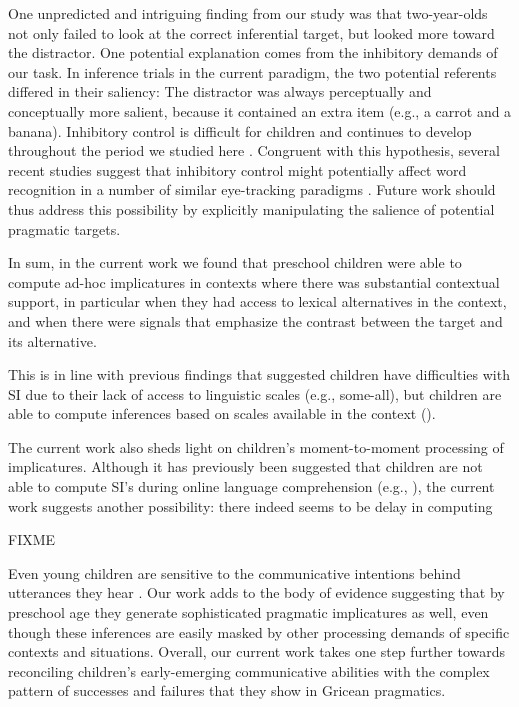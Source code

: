 \documentclass[10pt,letterpaper]{article}
\begin{document}
One unpredicted and intriguing finding from our study was that two-year-olds not only failed to look at the correct inferential target, but looked more toward the distractor. One potential explanation comes from the inhibitory demands of our task. In inference trials in the current paradigm, the two potential referents differed in their saliency: The distractor was always perceptually and conceptually more salient, because it contained an extra item (e.g., a carrot and a banana). Inhibitory control is difficult for children and continues to develop throughout the period we studied here \cite{davidson2006development, gerardi2000sensitivity}. Congruent with this hypothesis, several recent studies suggest that inhibitory control might potentially affect word recognition in a number of similar eye-tracking paradigms \cite{yurovskybeyond,nordmeyer2013measuring}. Future work should thus address this possibility by explicitly manipulating the salience of potential pragmatic targets.

In sum, in the current work we found that preschool children were able to compute ad-hoc implicatures in contexts where there was substantial contextual support, in particular when they had access to lexical alternatives in the context, and when there were signals that emphasize the contrast between the target and its alternative. 

This is in line with previous findings that suggested children have difficulties with SI due to their lack of access to linguistic scales (e.g., some-all), but children are able to compute inferences based on scales available in the context (\cite{barner2011accessing, stillerLLD}). 

The current work also sheds light on children's moment-to-moment processing of implicatures. Although it has previously been suggested that children are not able to compute SI's during online language comprehension (e.g., ), the current work suggests another possibility: there indeed seems to be delay in computing  

FIXME %

Even young children are sensitive to the communicative intentions behind utterances they hear \cite{clark2009first,baldwin1993early}. Our work adds to the body of evidence suggesting that by preschool age they generate sophisticated pragmatic implicatures as well, even though these inferences are easily masked by other processing demands of specific contexts and situations. Overall, our current work takes one step further towards reconciling children's early-emerging communicative abilities with the complex pattern of successes and failures that they show in Gricean pragmatics.
\end{document}
